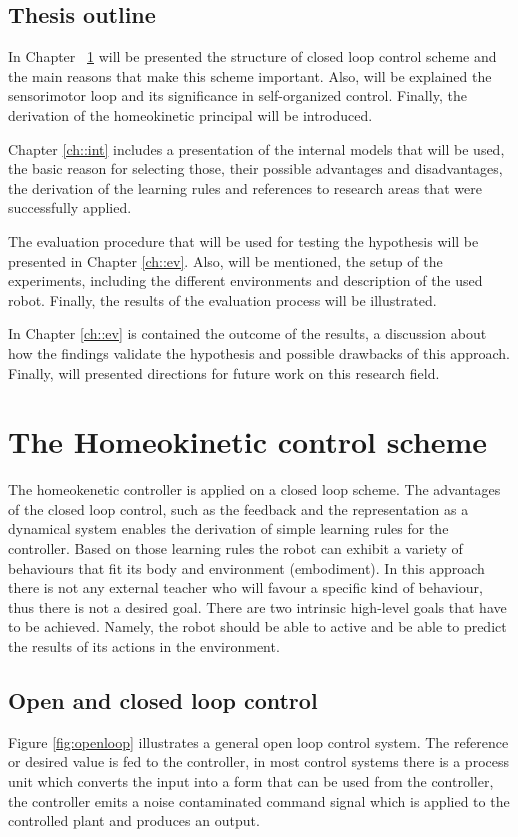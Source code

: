 \documentclass[msc,ai,logo]{infthesis}
\begin{document}
\section*{Thesis outline}
In Chapter ~\ref{ch::hom} will be presented the structure of closed loop control scheme and the main reasons that make this scheme important. Also, will be explained the sensorimotor loop and its significance in self-organized control. Finally, the derivation of the homeokinetic principal will be introduced.    

Chapter \ref{ch::int} includes a presentation of the internal models that will be used, the basic reason for selecting those, their possible advantages and disadvantages, the derivation of the learning rules and references to research areas that were successfully applied.  
 
The evaluation procedure that will be used for testing the hypothesis will be presented in Chapter \ref{ch::ev}. Also, will be mentioned, the setup of the  experiments, including the different environments and description of the used robot. Finally, the results of the evaluation process will be illustrated.

In Chapter \ref{ch::ev} is contained the outcome of the results, a discussion about how the findings validate the hypothesis and possible drawbacks of this approach. Finally, will presented directions for future work on this research field.   
   

\chapter{The Homeokinetic control scheme }
\label{ch::hom}
The homeokenetic controller is applied on a closed loop scheme. The advantages of the closed loop control, such as the feedback and the representation as a dynamical system enables the derivation of simple learning rules for the controller. Based on those learning rules the robot can exhibit a variety of behaviours that fit its body and environment (embodiment). In this approach there is not any external teacher who will favour a specific kind of behaviour, thus there is not a desired goal. There are two intrinsic high-level goals that have to be achieved. Namely, the robot should be able to active and be able to predict the results of its actions in the environment.  

\section{Open and closed loop control}
Figure \ref{fig:openloop} illustrates a general open loop control system. The reference or desired value is fed to the controller, in most control systems there is a process unit which converts the input into a form that can be used from the controller, the controller emits a noise contaminated command signal which is applied to the controlled plant and produces an output. 
\end{document}

